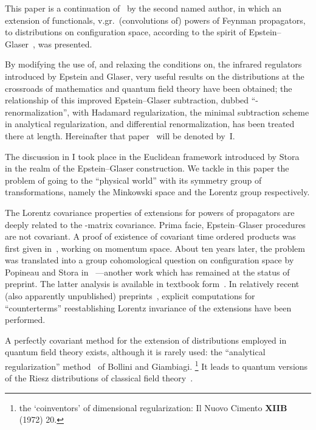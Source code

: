 \documentclass[a4paper,12pt]{article}
\makeatletter
\providecommand{\7}{\dagger}           %
\def\section{\@startsection{section}{1}{\z@}{-3.5ex plus -1ex minus
      -.2ex}{2.3ex plus .2ex}{\large\bf}}
\theoremstyle{plain}
\theoremstyle{definition}
\makeatother
\begin{document}
\section{Introduction}

This paper is a continuation of~\cite{Carme} by the second named
author, in which an extension of functionals, v.gr.\ (convolutions of)
powers of Feynman propagators, to distributions on configuration
space, according to the spirit of Epstein--Glaser~\cite{EG}, was
presented.

By modifying the use of, and relaxing the conditions on, the infrared
regulators \coordHE{} introduced by Epstein and Glaser, very useful results
on the distributions at the crossroads of mathematics and quantum
field theory have been obtained; the relationship of this improved
Epstein--Glaser subtraction, dubbed ``\coordHE{}-renormalization'', with
Hadamard regularization, the minimal subtraction scheme in analytical
regularization, and differential renormalization, has been treated
there at length. Hereinafter that paper~\cite{Carme} will be denoted
by~I.

The discussion in I took place in the Euclidean framework introduced
by Stora~\cite{EllRen} in the realm of the Epstein--Glaser
construction. We tackle in this paper the problem of going to the
``physical world'' with its symmetry group of transformations, namely
the Minkowski space and the Lorentz group respectively.

The Lorentz covariance properties of extensions for powers of
propagators are deeply related to the \coordHE{}-matrix covariance. Prima
facie, Epstein--Glaser procedures are not covariant. A proof of
existence of covariant time ordered products was first given
in~\cite{EG}, working on momentum space. About ten years later, the
problem was translated into a group cohomological question on
configuration space by Popineau and Stora in~\cite{PoSt} ---another
work which has remained at the status of preprint. The latter analysis
is available in textbook form~\cite{Scharf}. In relatively recent
(also apparently unpublished) preprints~\cite{Prangeetal, PrangeII},
explicit computations for ``counterterms'' reestablishing Lorentz
invariance of the extensions have been performed.

A perfectly covariant method for the extension of distributions
employed in quantum field theory exists, although it is rarely used:
the ``analytical regularization'' method~\cite{ThreeFromBA} of Bollini
and Giambiagi.%
\footnote{the `coinventors' of dimensional regularization:
Il Nuovo Cimento {\bf XIIB} (1972) 20.}
It leads to quantum versions of the Riesz distributions of classical
field theory~\cite{Riesz, Jager, Kanwal}.
\end{document}
